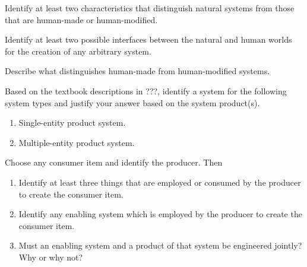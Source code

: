 \begin{exercises}
    \begin{exercise}
    \label{sea-2-1}
        Identify at least two characteristics that distinguish natural systems from those that are human-made or human-modified. 
    \end{exercise}
    \begin{solution}
    \end{solution}
    
    \begin{exercise}
    \label{sea-2-2}
        Identify at least two possible interfaces between the natural and human worlds for the creation of any arbitrary system.
    \end{exercise}
    \begin{solution}
    \end{solution}
    
    \begin{exercise}
    \label{sea-2-3}
        Describe what distinguishes human-made from human-modified systems.
    \end{exercise}
    \begin{solution}
    \end{solution}
    
    \begin{exercise}
    \label{sea-2-5_6}
        Based on the textbook descriptions in ???, identify a system for the following system types and justify your answer based on the system product(s).
        \begin{enumerate}[label=\alph*)]
            \item Single-entity product system.
            \item Multiple-entity product system.
        \end{enumerate}
    \end{exercise}
    \begin{solution}
    \end{solution}
    
    \begin{exercise}
    \label{sea-2-7_8}
        Choose any consumer item and identify the producer. Then
        \begin{enumerate}[label=\alph*)]
            \item Identify at least three things that are employed or consumed by the producer to create the consumer item.
            \item Identify any enabling system which is employed by the producer to create the consumer item.
            \item Must an enabling system and a product of that system be engineered jointly? Why or why not?
        \end{enumerate}
    \end{exercise}
    \begin{solution}
    \end{solution}
    

\end{exercises}
